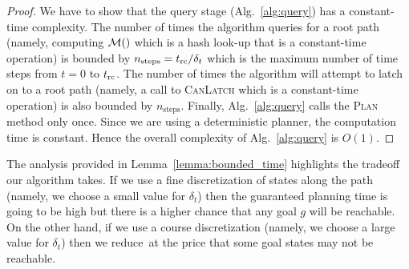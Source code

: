 \documentclass[conference]{IEEEtran}
\begin{document}
\begin{proof}
    We have to show that the query stage (Alg.~\ref{alg:query}) has a constant-time complexity. 
    The number of times the algorithm queries for a root path (namely, computing $\mathcal{M}()$  which is a hash look-up that is a constant-time operation) is bounded by $n_{\textrm{steps}} = t_{\textrm{rc}}/\delta_t$ which is the maximum number of time steps from $t = 0$ to $t_{\textrm{rc}}$. 
    The number of times the algorithm will attempt to latch on to a root path (namely, a call to \textsc{CanLatch}  which is a constant-time operation) is also bounded by $n_{\textrm{steps}}$. Finally, Alg.~\ref{alg:query} calls the \textsc{Plan} method only once.
    Since we are using a deterministic planner, the computation time is constant. 
    Hence the overall complexity of Alg.~\ref{alg:query} is $O(1)$.
\end{proof}

The analysis provided in Lemma~\ref{lemma:bounded_time} highlights the tradeoff our algorithm takes.
If we use a fine discretization of states along the path (namely, we choose a small value for $\delta_t$) then the guaranteed  planning time \Tbound is going to be high but there is a higher chance that any goal $g$ will be reachable.
On the other hand, if we use a course discretization (namely, we choose a large value for $\delta_t$) then we reduce~\Tbound at the price that some goal states may not be reachable.
%
\end{document}

